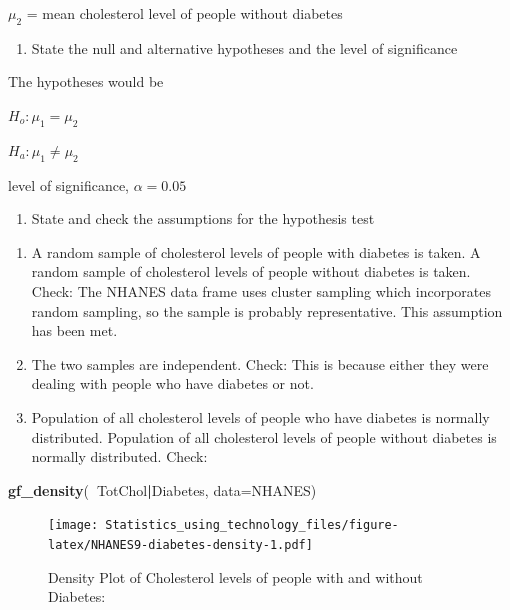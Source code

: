\documentclass[
]{book}
\newenvironment{Shaded}{\begin{snugshade}}{\end{snugshade}}
\newcommand{\DataTypeTok}[1]{\textcolor[rgb]{0.13,0.29,0.53}{#1}}
\newcommand{\KeywordTok}[1]{\textcolor[rgb]{0.13,0.29,0.53}{\textbf{#1}}}
\newcommand{\NormalTok}[1]{#1}
\newcommand{\OperatorTok}[1]{\textcolor[rgb]{0.81,0.36,0.00}{\textbf{#1}}}
\providecommand{\tightlist}{%
  \setlength{\itemsep}{0pt}\setlength{\parskip}{0pt}}
\begin{document}
\(\mu_2\) = mean cholesterol level of people without diabetes

\begin{enumerate}
\def\labelenumi{\arabic{enumi}.}
\setcounter{enumi}{1}
\tightlist
\item
  State the null and alternative hypotheses and the level of significance
\end{enumerate}

The hypotheses would be

\(H_o: \mu_1=\mu_2\)

\(H_a: \mu_1 \ne \mu_2\)

level of significance, \(\alpha=0.05\)

\begin{enumerate}
\def\labelenumi{\arabic{enumi}.}
\setcounter{enumi}{2}
\tightlist
\item
  State and check the assumptions for the hypothesis test
\end{enumerate}

\begin{enumerate}
\def\labelenumi{\alph{enumi}.}
\item
  A random sample of cholesterol levels of people with diabetes is taken. A random sample of cholesterol levels of people without diabetes is taken. Check: The NHANES data frame uses cluster sampling which incorporates random sampling, so the sample is probably representative. This assumption has been met.
\item
  The two samples are independent. Check: This is because either they were dealing with people who have diabetes or not.
\item
  Population of all cholesterol levels of people who have diabetes is normally distributed. Population of all cholesterol levels of people without diabetes is normally distributed.
  Check:
\end{enumerate}



\begin{Shaded}
\begin{Highlighting}[]
\KeywordTok{gf_density}\NormalTok{(}\OperatorTok{~}\NormalTok{TotChol}\OperatorTok{|}\NormalTok{Diabetes, }\DataTypeTok{data=}\NormalTok{NHANES)}
\end{Highlighting}
\end{Shaded}

\begin{figure}
\centering
\texttt{[image: Statistics\_using\_technology\_files/figure-latex/NHANES9-diabetes-density-1.pdf]}
\caption{\label{fig:NHANES9-diabetes-density}Density Plot of Cholesterol levels of people with and without Diabetes:}
\end{figure}
\end{document}
